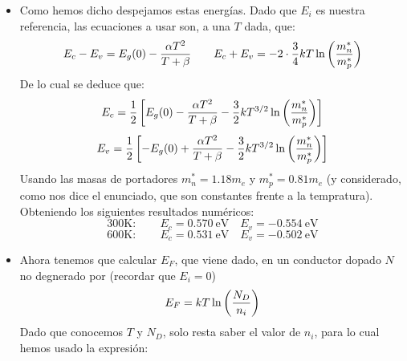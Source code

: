 \begin{texercise}
	\begin{itemize}
		\item Como hemos dicho despejamos estas energías. Dado que $E_i$ es nuestra referencia, las ecuaciones a usar son, a una $T$ dada, que:
		      \begin{equation}
			      E_c-E_v = E_g(0) - \frac{\alpha T^2}{T+\beta} \qquad E_c+E_v=-2 \cdot \frac{3}{4} kT\ln \left( \frac{m_n^*}{m_p^*} \right)
		      \end{equation}
		      De lo cual se deduce que:
		      \begin{equation}
			      E_c = \frac{1}{2} \left[ E_g(0) - \frac{\alpha T^2}{T+\beta} - \frac{3}{2} kT^{3/2} \ln \left( \frac{m_n^*}{m_p^*} \right) \right]
		      \end{equation}
		      \begin{equation}
			      E_v = \frac{1}{2} \left[ -E_g(0) +\frac{\alpha T^2}{T+\beta} - \frac{3}{2} kT^{3/2} \ln \left( \frac{m_n^*}{m_p^*} \right) \right]
		      \end{equation}
		      Usando las masas de portadores $m_n^*=1.18m_e$ y $m_p^*=0.81m_e$  (y considerado, como nos dice el enunciado, que son constantes frente a la tempratura). Obteniendo los siguientes resultados numéricos:
		      \begin{equation}
			      \text{300K}: \qquad
			      E_c = 0.570 \ \text{eV} \quad E_v = -0.554 \ \text{eV}
		      \end{equation}
		      \begin{equation}
			      \text{600K}: \qquad
			      E_c = 0.531  \ \text{eV} \quad E_v = -0.502\ \text{eV}
		      \end{equation}
		\item Ahora tenemos que calcular $E_F$, que viene dado, en un conductor dopado $N$ no degnerado por (recordar que $E_i=0$)
		      \begin{equation}
			      E_F = kT \ln \left( \frac{N_D}{n_i} \right)
		      \end{equation}
		      Dado que conocemos $T$ y $N_D$, solo resta saber el valor de $n_i$, para lo cual hemos usado la expresión:


\end{itemize}
\end{texercise}
